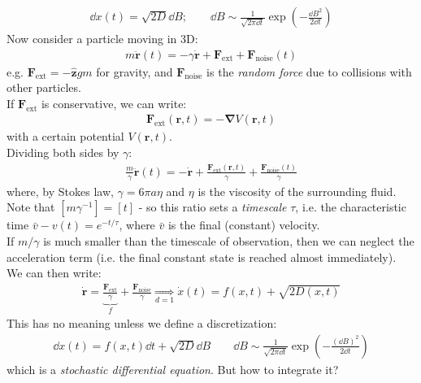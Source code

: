 \documentclass[../template.tex]{subfiles}
\begin{document}
\begin{align*}
    \dd{x}(t) = \sqrt{2D} \dd{B}; \qquad \dd{B} \sim \frac{1}{\sqrt{2 \pi \dd{t}}} \exp\left(-\frac{\dd{B}^2}{2 \dd{t}} \right) 
\end{align*}
Now consider a particle moving in 3D:
\begin{align*}
    m \ddot{\bm{r}} (t) = - \gamma\dot{\bm{r}} + \bm{F}_{\mathrm{ext} } + \bm{F}_{\mathrm{noise} }(t)
\end{align*}
e.g. $\bm{F}_{\mathrm{ext} 
} = -\bm{\hat{z}} g m$ for gravity, and $\bm{F}_{\mathrm{noise} }$ is the \textit{random force} due to collisions with other particles.\\
If $\bm{F}_{\mathrm{ext} }$ is conservative, we can write:
\begin{align*}
    \bm{F}_{\mathrm{ext} }(\bm{r},t) = - \bm{\nabla} V(\bm{r},t)
\end{align*}     
with a certain potential $V(\bm{r}, t)$.\\
Dividing both sides by $\gamma$:
\begin{align*}
    \frac{m}{\gamma} \ddot{\bm{r}}(t) = - \dot{\bm{r}} + \frac{\bm{F}_{\mathrm{ext} }(\bm{r},t)}{\gamma} + \frac{\bm{F}_{\mathrm{noise} }(t)}{\gamma}  
\end{align*}  
where, by Stokes law, $\gamma = 6 \pi a \eta$ and $\eta$ is the viscosity of the surrounding fluid. Note that $[m \gamma^{-1}] = [t]$ - so this ratio sets a \textit{timescale} $\tau$, i.e. the characteristic time $\bar{v} - v(t) = e^{-t/\tau}$, where $\bar{v}$ is the final (constant) velocity.\\
If $m/\gamma$ is much smaller than the timescale of observation, then we can neglect the acceleration term (i.e. the final constant state is reached almost immediately).\\
We can then write:
\begin{align*}
    \dot{\bm{r}} = \underbrace{\frac{\bm{F}_{\mathrm{ext} }}{\gamma}}_{f}  + \frac{\bm{F}_{\mathrm{noise} }}{\gamma} \underset{d=1}{ \Rightarrow}  \dot{x}(t) = f(x,t) + \sqrt{2 D(x,t)}
\end{align*}
This has no meaning unless we define a discretization:
\begin{align*}
    \dd{x}(t) = f(x,t) \dd{t} + \sqrt{2D} \dd{B}\qquad \dd{B} \sim \frac{1}{\sqrt{2\pi \dd{t}}} \exp\left(-\frac{(\dd{B})^2}{2\dd{t}} \right) 
\end{align*}
which is a \textit{stochastic differential equation}. But how to integrate it? 
\end{document}
